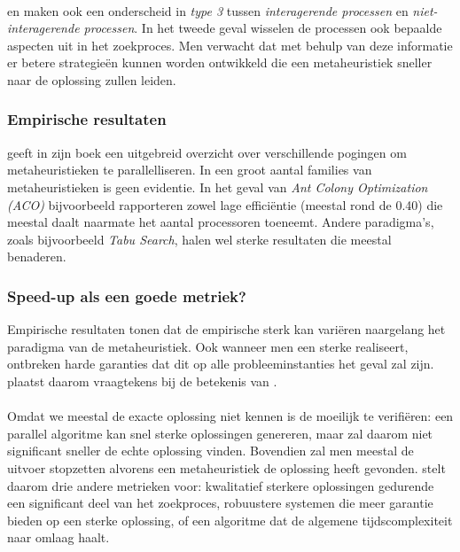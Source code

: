 \paragraph{}
 en  maken ook een onderscheid in \emph{type 3} tussen \emph{interagerende processen} en \emph{niet-interagerende processen}. In het tweede geval wisselen de processen ook bepaalde aspecten uit in het zoekproces. Men verwacht dat met behulp van deze informatie er betere strategie\"en kunnen worden ontwikkeld die een metaheuristiek sneller naar de oplossing zullen leiden.

\subsubsection{Empirische resultaten}

 geeft in zijn boek een uitgebreid overzicht over verschillende pogingen om metaheuristieken te parallelliseren. In een groot aantal families van metaheuristieken is \ablsu{} geen evidentie. In het geval van \emph{Ant Colony Optimization (ACO)} bijvoorbeeld rapporteren zowel \cite{Souto2004,Randall2002,Delisle2001,Catalano:2001:PRH:761889.761897} lage effici\"entie (meestal rond de 0.40) die meestal daalt naarmate het aantal processoren toeneemt. Andere paradigma's, zoals bijvoorbeeld \emph{Tabu Search}, halen wel sterke resultaten die meestal \ablsu{} benaderen.

\subsubsection{Speed-up als een goede metriek?}
Empirische resultaten tonen dat de empirische \absu{} sterk kan vari\"eren naargelang het paradigma van de metaheuristiek. Ook wanneer men een sterke \absu{} realiseert, ontbreken harde garanties dat dit op alle probleeminstanties het geval zal zijn. \cite{crainicAndToulouse} plaatst daarom vraagtekens bij de betekenis van \absu{}.

\paragraph{}
Omdat we meestal de exacte oplossing niet kennen is de \absu{} moeilijk te verifi\"eren: een parallel algoritme kan snel sterke oplossingen genereren, maar zal daarom niet significant sneller de echte oplossing vinden. Bovendien zal men meestal de uitvoer stopzetten alvorens een metaheuristiek de oplossing heeft gevonden. \cite{crainicAndToulouse} stelt daarom drie andere metrieken voor: kwalitatief sterkere oplossingen gedurende een significant deel van het zoekproces, robuustere systemen die meer garantie bieden op een sterke oplossing, of een algoritme dat de algemene tijdscomplexiteit naar omlaag haalt.

